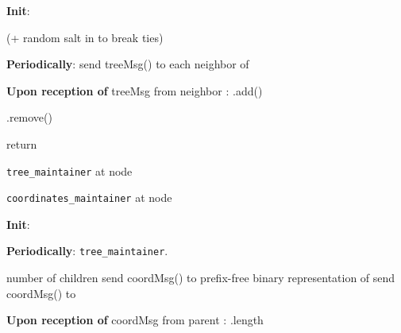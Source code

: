 \documentclass[conference]{IEEEtran}
\begin{document}
\begin{algorithm}[t]
\begin{algorithmic}
\begin{small}


\State \textbf{Init}:

	\State 
	\State  (+ random salt in  to break ties)
	\State 
	\State 

\vspace{0.06in}

\State \textbf{Periodically}:
	\State send treeMsg() to each neighbor of 

\vspace{0.06in}

\State \textbf{Upon reception of} treeMsg  from neighbor :
	\State  {}
		\State 
		\State 
		\State 
	\EndIf
		\State .add()

	\EndIf
		\State .remove()
	\EndIf

\vspace{0.06in}

	\State return 
\EndProcedure
\end{small}
\end{algorithmic}
\caption{\texttt{tree\_maintainer} at node }
\label{alg:simpleTreeMaint}
\end{algorithm}



\begin{algorithm}
\caption{\texttt{coordinates\_maintainer} at node }
\begin{algorithmic}
\begin{small}
\State \textbf{Init}:
	\State  \vspace{0.06in}

\State \textbf{Periodically}:
	\State  \texttt{tree\_maintainer}.
		\State {}
	\EndIf

\vspace{0.06in}

	\State  number of children
	\If {}
		\State send coordMsg() to 
	\EndIf
	\If {}
			\State  prefix-free binary representation of 
\State send coordMsg() to 
		\EndFor
	\EndIf
\EndProcedure

\vspace{0.06in}

\State \textbf{Upon reception of} coordMsg  from parent :
	\State  {}
	\State .length
		\If {}
			\State 
		\Else
			\State 
		\EndIf
	\EndFor

		\If {}
			\State 
		\EndIf
		\If {}
			\State 
		\EndIf
	\EndFor
		\State {}
	\EndIf
\end{small}
\end{algorithmic}
\label{alg:coordMaint}

\end{algorithm}
\end{document}
